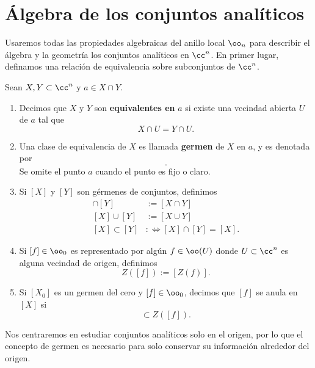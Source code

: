 	
\section{Álgebra de los conjuntos analíticos}
	
		Usaremos todas las propiedades algebraicas del anillo local $\oo_n$ para describir el álgebra y la geometría los conjuntos analíticos en $\cc^n$. En primer lugar, definamos una relación de equivalencia sobre subconjuntos de $\cc^n$.
	\begin{definition}
			Sean $X,Y\subset \cc^n$ y $a\in X\cap Y$.
			\begin{enumerate}
				\item Decimos  que $X$ y $Y$ son \textbf{equivalentes en} $a$ si existe una vecindad abierta $U$ de $a$ tal que
				\begin{equation*}
					X\cap U = Y\cap U.
				\end{equation*}
				\item Una clase de equivalencia de $X$ es  llamada \textbf{germen} de $X$ en $a$, y es denotada por
				\begin{equation*}
					[X_a].
				\end{equation*}
				Se omite el punto $a$ cuando el punto es fijo o claro.
				\item Si $[X]$ y $[Y]$ son gérmenes de conjuntos, definimos
				\begin{align*}
					[X]\cap[Y]&:=[X\cap Y]\\
					[X]\cup[Y]&:=[X\cup Y]\\
					[X]\subset[Y]&:\Longleftrightarrow [X]\cap[Y]=[X].
				\end{align*}
				\item Si $[f]\in\oo_0$ es representado por algún $f\in\oo(U)$ donde $U\subset\cc^n$ es alguna vecindad de origen, definimos
				\begin{equation}
					Z([f]):=[Z(f)].
				\end{equation}
				\item [5. ]Si $[X_0]$ es un germen del cero y $[f]\in\oo_0$, decimos que $[f]$ se anula en $[X]$ si
				\begin{equation*}
					[X]\subset Z([f]).
				\end{equation*}
			\end{enumerate}
	\end{definition}

	Nos centraremos en estudiar conjuntos analíticos solo en el origen, por lo que el concepto de germen es necesario para solo conservar su información alrededor del origen.
	
